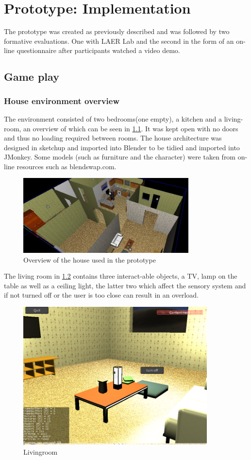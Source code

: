 \chapter{Prototype: Implementation}
The prototype was created as previously described and was followed by two formative evaluations. One with LAER Lab and the second in the form of an on-line questionnaire after participants watched a video demo. 

\section{Game play}

\subsection*{House environment overview}
The environment consisted of two bedrooms(one empty), a kitchen and a living-room, an overview of which can be seen in \ref{old_house}. It was kept open with no doors and thus no loading required between rooms. The house architecture was designed in sketchup and imported into Blender to be tidied and imported into JMonkey. Some models (such as furniture and the character) were taken from on-line resources such as blendswap.com.  

\begin{figure}[H]
\centering
\includegraphics[width=90mm]{images/prototype/old_fullhouse.jpg}
\caption{Overview of the house used in the prototype}
\label{old_house}
\end{figure}

The living room in \ref{prototype_livingroom} contains three interact-able objects, a TV, lamp on the table as well as a ceiling light, the latter two which affect the sensory system and if not turned off or the user is too close can result in an overload. 

\begin{figure}[H]
\centering
\includegraphics[width=100mm]{images/prototype/livingroom.png}
\caption{Livingroom}
\label{prototype_livingroom}
\end{figure}

